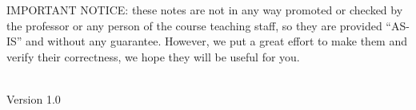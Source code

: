\documentclass[11pt]{report}
\makeatletter
\let\thedate\@date
\makeatother
\begin{document}
\begin{titlepage}
	\begin{minipage}{\textwidth}
		IMPORTANT NOTICE: these notes are not in any way promoted or checked by the professor or any
		person of the course teaching staff, so they are provided “AS-IS” and without any guarantee. However,
		we put a great effort to make them and verify their correctness, we hope they will be useful for you.
	\end{minipage}\\ [0.5 cm]

	{\large Version 1.0 \\ \thedate}\\

	
\end{titlepage}




\tableofcontents
\pagebreak

\def\slides{slides/01_intro.pdf}


\def\slides{slides/02_crypto_p1.pdf}










\appendix


\end{document}
